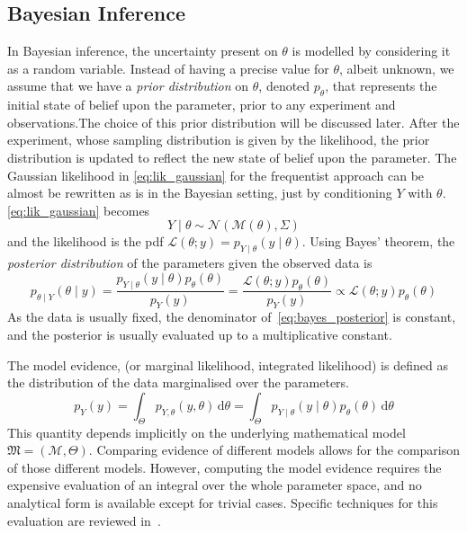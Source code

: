 \documentclass[../../Main_ManuscritThese.tex]{subfiles}
\begin{document}
\subsection{Bayesian Inference}
\label{sec:bayesian_inference_MAP}
In Bayesian inference, the uncertainty present on $\theta$ is modelled by considering it as a random variable. Instead of having a precise value for $\theta$, albeit unknown, we assume that we have a \emph{prior distribution} on $\theta$, denoted $p_{\theta}$, that represents the initial state of belief upon the parameter, prior to any experiment and observations.The choice of this prior distribution will be discussed later.
After the experiment, whose sampling distribution is given by the likelihood, the prior distribution is updated to reflect the new state of belief upon the parameter. 
The Gaussian likelihood in \cref{eq:lik_gaussian} for the frequentist approach can be almost be rewritten as is in the Bayesian setting, just by conditioning $Y$ with $\theta$.
\cref{eq:lik_gaussian} becomes
\begin{equation}
  Y \mid  \theta \sim \mathcal{N}(\mathcal{M}(\theta), \Sigma)
\end{equation}
and the likelihood is the pdf $\mathcal{L}(\theta;y) = p_{Y\mid \theta}(y \mid  \theta)$.
Using Bayes' theorem, the \emph{posterior distribution} of the parameters given the observed data is
\begin{equation}
  \label{eq:bayes_posterior}
  p_{\theta \mid Y}(\theta \mid y) = \frac{p_{Y\mid \theta}(y \mid  \theta)p_{\theta}(\theta)}{p_Y(y)} = \frac{\mathcal{L}(\theta;y)p_{\theta}(\theta)}{p_Y(y)} \propto \mathcal{L}(\theta;y)p_{\theta}(\theta)
\end{equation}
As the data is usually fixed, the denominator of~\eqref{eq:bayes_posterior} is constant, and the posterior is usually evaluated up to a multiplicative constant.


\begin{definition}
  \label{def:model_evidence}
  The model evidence, (or marginal likelihood, integrated likelihood) is defined as the distribution of the data marginalised over the parameters.
  \begin{equation}
    \label{eq:model_evidence}
    p_Y(y) = \int_{\Theta}p_{Y,\theta}(y,\theta)\,\mathrm{d}\theta = \int_{\Theta}p_{Y \mid \theta}(y \mid \theta)p_{\theta}(\theta)\,\mathrm{d}\theta
  \end{equation}
  This quantity depends implicitly on the underlying mathematical model $\mathfrak{M} = (\mathcal{M},\Theta)$. Comparing evidence of different models allows for the comparison of those different models. However, computing the model evidence requires the expensive evaluation of an integral over the whole parameter space, and no analytical form is available except for trivial cases. Specific techniques for this evaluation are reviewed in~\cite{friel_estimating_2011}.
\end{definition}
\end{document}
